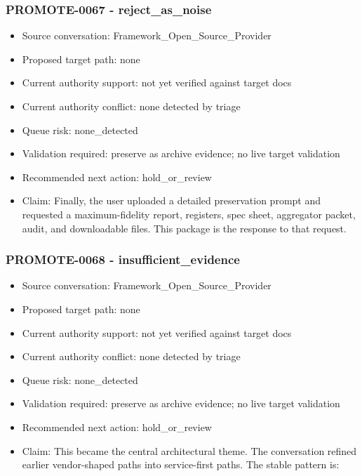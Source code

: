 \documentclass[11pt,a4paper]{report}
\begin{document}
\subsubsection{PROMOTE-0067 - reject\_as\_noise}

\begin{itemize}
\item Source conversation: Framework\_Open\_Source\_Provider
\item Proposed target path: none
\item Current authority support: not yet verified against target docs
\item Current authority conflict: none detected by triage
\item Queue risk: none\_detected
\item Validation required: preserve as archive evidence; no live target validation
\item Recommended next action: hold\_or\_review
\item Claim: Finally, the user uploaded a detailed preservation prompt and requested a maximum-fidelity report, registers, spec sheet, aggregator packet, audit, and downloadable files. This package is the response to that request.
\end{itemize}

\subsubsection{PROMOTE-0068 - insufficient\_evidence}

\begin{itemize}
\item Source conversation: Framework\_Open\_Source\_Provider
\item Proposed target path: none
\item Current authority support: not yet verified against target docs
\item Current authority conflict: none detected by triage
\item Queue risk: none\_detected
\item Validation required: preserve as archive evidence; no live target validation
\item Recommended next action: hold\_or\_review
\item Claim: This became the central architectural theme. The conversation refined earlier vendor-shaped paths into service-first paths. The stable pattern is:
\end{itemize}
\end{document}
